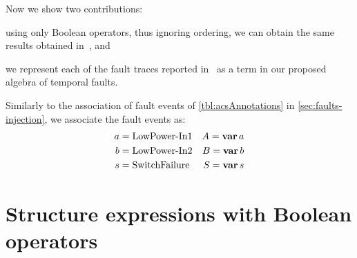 \documentclass[12pt,openright,twoside,a4paper,oldfontcommands,english,brazil,draft]{abntex2}
\theoremstyle{theo}
\def\varop{\ensuremath\operatorname{\mathbf{var}}}
\newcommand{\var}[1]{\ensuremath\varop #1}
\begin{document}

Now we show two contributions:
\begin{alineasinline}
  \item using only Boolean operators, thus ignoring ordering, we can obtain the same results obtained in~\cite{DM2012}, and
  \item we represent each of the fault traces reported in~\cite{DM2012} as a term in our proposed algebra of temporal faults.
\end{alineasinline}
Similarly to the association of fault events of \cref{tbl:acsAnnotations} in \cref{sec:faults-injection}, we associate the fault events as:
%
\begin{align*}
a &= \text{LowPower-In1}& A = \var a\\
b &= \text{LowPower-In2}& B = \var b\\
s &= \text{SwitchFailure}& S = \var s
\end{align*}

\section{Structure expressions with Boolean operators}
\end{document}
